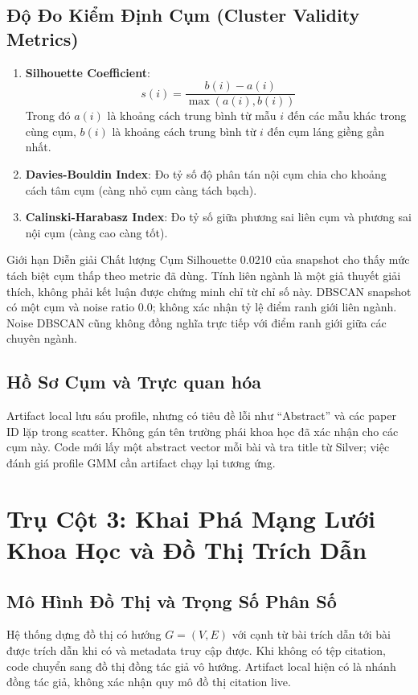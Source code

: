 \subsection{Độ Đo Kiểm Định Cụm (Cluster Validity Metrics)}
\begin{enumerate}[label=\alph*)]
  \item \textbf{Silhouette Coefficient}:
    \begin{equation}
      s(i) = \frac{b(i) - a(i)}{\max(a(i), b(i))}
    \end{equation}
    Trong đó $a(i)$ là khoảng cách trung bình từ mẫu $i$ đến các mẫu khác trong cùng cụm, $b(i)$ là khoảng cách trung bình từ $i$ đến cụm láng giềng gần nhất.
  \item \textbf{Davies-Bouldin Index}: Đo tỷ số độ phân tán nội cụm chia cho khoảng cách tâm cụm (càng nhỏ cụm càng tách bạch).
  \item \textbf{Calinski-Harabasz Index}: Đo tỷ số giữa phương sai liên cụm và phương sai nội cụm (càng cao càng tốt).
\end{enumerate}

\begin{calloutbox}{Giới hạn Diễn giải Chất lượng Cụm}
Silhouette 0.0210 của snapshot cho thấy mức tách biệt cụm thấp theo metric đã dùng. Tính liên ngành là một giả thuyết giải thích, không phải kết luận được chứng minh chỉ từ chỉ số này. DBSCAN snapshot có một cụm và noise ratio 0.0; không xác nhận tỷ lệ điểm ranh giới liên ngành. Noise DBSCAN cũng không đồng nghĩa trực tiếp với điểm ranh giới giữa các chuyên ngành.
\end{calloutbox}

\subsection{Hồ Sơ Cụm và Trực quan hóa}
Artifact local lưu sáu profile, nhưng có tiêu đề lỗi như ``Abstract'' và các paper ID lặp trong scatter. Không gán tên trường phái khoa học đã xác nhận cho các cụm này. Code mới lấy một abstract vector mỗi bài và tra title từ Silver; việc đánh giá profile GMM cần artifact chạy lại tương ứng.

\section{Trụ Cột 3: Khai Phá Mạng Lưới Khoa Học và Đồ Thị Trích Dẫn}

\subsection{Mô Hình Đồ Thị và Trọng Số Phân Số}
Hệ thống dựng đồ thị có hướng $G=(V,E)$ với cạnh từ bài trích dẫn tới bài được trích dẫn khi có  và metadata truy cập được. Khi không có tệp citation, code chuyển sang đồ thị đồng tác giả vô hướng. Artifact local hiện có là nhánh đồng tác giả, không xác nhận quy mô đồ thị citation live.

